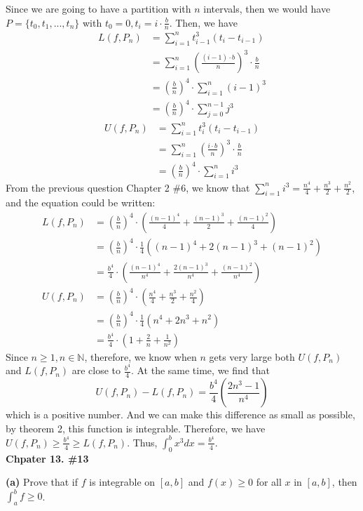 \documentclass[a4paper,12pt]{report}
\begin{document}
\noindent
Since we are going to have a partition with $n$ intervals, then we would have $P=\{t_0,t_1,...,t_n\}$ with $t_0=0, t_i=i\cdot{\frac{b}{n}}$. Then, we have
\begin{align*}
L(f,P_n)&=\sum_{i=1}^{n}t_{i-1}^{3}(t_i-t_{i-1})\\
&=\sum_{i=1}^{n}(\frac{(i-1)\cdot{b}}{n})^{3}\cdot{\frac{b}{n}}\\
&=(\frac{b}{n})^4\cdot{\sum_{i=1}^{n}(i-1)^{3}}\\
&=(\frac{b}{n})^4\cdot{\sum_{j=0}^{n-1}j^{3}}
\end{align*}
\begin{align*}
U(f,P_n)&=\sum_{i=1}^{n}t_{i}^{3}(t_i-t_{i-1})\\
&=\sum_{i=1}^{n}(\frac{i\cdot{b}}{n})^{3}\cdot{\frac{b}{n}}\\
&=(\frac{b}{n})^4\cdot{\sum_{i=1}^{n}i^{3}}
\end{align*}
From the previous question Chapter 2 \#6, we know that $\sum_{i=1}^{n}i^3=\frac{n^4}{4}+\frac{n^3}{2}+\frac{n^2}{2}$, and the equation could be written:
\begin{align*}
L(f,P_n)&=(\frac{b}{n})^4\cdot{(\frac{(n-1)^4}{4}+\frac{(n-1)^3}{2}+\frac{(n-1)^2}{4})}\\
&=(\frac{b}{n})^4\cdot{\frac{1}{4}}((n-1)^4+2(n-1)^3+(n-1)^2)\\
&=\frac{b^4}{4}\cdot{(\frac{(n-1)^4}{n^4}+\frac{2(n-1)^3}{n^4}+\frac{(n-1)^2}{n^4})}\\
U(f,P_n)&=(\frac{b}{n})^4\cdot{(\frac{n^4}{4}+\frac{n^3}{2}+\frac{n^2}{4})}\\
&=(\frac{b}{n})^4\cdot{\frac{1}{4}}(n^4+2n^3+n^2)\\
&=\frac{b^4}{4}\cdot{(1+\frac{2}{n}+\frac{1}{n^2})}
\end{align*}
Since $n\geq 1, n\in \mathbb{N}$, therefore, we know when $n$ gets very large both $U(f,P_n)$ and $L(f,P_n)$ are close to $\frac{b^4}{4}$. At the same time, we find that \[U(f,P_n)-L(f,P_n)=\frac{b^4}{4}(\frac{2n^3-1}{n^4})\] which is a positive number. And we can make this difference as small as possible, by theorem 2, this function is integrable. Therefore, we have $U(f,P_n)\geq \frac{b^4}{4} \geq L(f,P_n)$. Thus, $\int_{0}^{b}x^3dx=\frac{b^4}{4}$. \\

\noindent
\textbf{Chpater 13. \#13}

\noindent
\textbf{(a)} Prove that if $f$ is integrable on $[a,b]$ and $f(x)\geq 0$ for all $x$ in $[a,b]$, then $\int_{a}^{b}f\geq 0$. 
\end{document}

